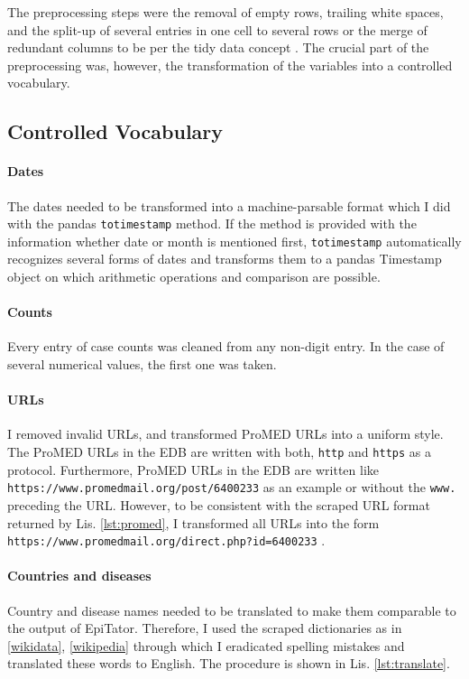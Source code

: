 The preprocessing steps were the removal of empty rows, trailing white spaces, and the split-up of several entries in one cell to several rows or the merge of redundant columns to be per the tidy data concept \citep{Wickham2014}.
The crucial part of the preprocessing was, however, the transformation of the variables into a controlled vocabulary.

\subsection{Controlled Vocabulary}
\paragraph{Dates}
The dates needed to be transformed into a machine-parsable format which I did with the pandas \texttt{totimestamp} method. If the method is provided with the information whether date or month is mentioned first, \texttt{totimestamp} automatically recognizes several forms of dates and transforms them to a pandas Timestamp object on which arithmetic operations and comparison are possible.

\paragraph{Counts}
Every entry of case counts was cleaned from any non-digit entry. In the case of several numerical values, the first one was taken.

\paragraph{URLs}
I removed invalid URLs, and transformed ProMED URLs into a uniform style. The ProMED URLs in the EDB are written with both, \texttt{http} and \texttt{https} as a protocol. Furthermore, ProMED URLs in the EDB are written like \textquotesingle \texttt{https://www.promedmail.org/post/6400233} \textquotesingle as an example or without the \texttt{www.} preceding the URL. However, to be consistent with the scraped URL format returned by Lis. \ref{lst:promed}, I transformed all URLs into the form \textquotesingle \texttt{https://\allowbreak www.promedmail.org/\allowbreak direct.php?id=6400233} \textquotesingle.

\paragraph{Countries and diseases}
Country and disease names needed to be translated to make them comparable to the output of EpiTator. Therefore, I used the scraped dictionaries as in \ref{wikidata}, \ref{wikipedia} through which I eradicated spelling mistakes and translated these words to English. The procedure is shown in Lis. \ref{lst:translate}.

